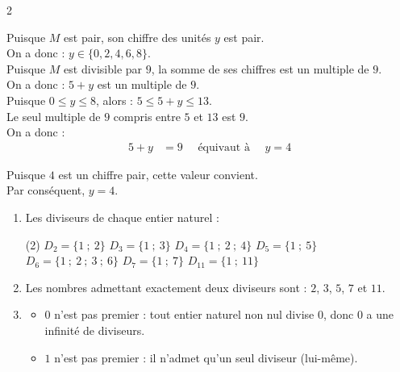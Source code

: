 \documentclass[10pt, a4paper]{article}
\begin{document}
\begin{multicols*}{2}
\begin{Solution}[APPLICATION][6]
\begin{enumerate}[leftmargin=*,itemsep=0.5pt]
    Puisque $M$ est pair, son chiffre des unités $y$ est pair. \\
    On a donc : $y \in \big\{0, 2, 4, 6, 8\big\}$. \\
    Puisque $M$ est divisible par $9$, la somme de ses chiffres est un multiple de $9$. \\
    On a donc : $5 + y$ est un multiple de $9$. \\
    Puisque $0 \leq y \leq 8$, alors : $5 \leq 5 + y \leq 13$. \\
    Le seul multiple de $9$ compris entre $5$ et $13$ est $9$. \\
    On a donc :
    \begin{align*}
        5 + y &= 9 \quad \text{ équivaut à } \quad y = 4
    \end{align*}

    Puisque $4$ est un chiffre pair, cette valeur convient. \\
    Par conséquent, $y = 4$.
\end{enumerate}
\end{Solution}

\begin{Solution}[ACTIVITÉ][2]

\begin{enumerate}[leftmargin=*,itemsep=0.5pt]
    \item Les diviseurs de chaque entier naturel :
\begin{tasks}[label=$\bullet$, label-width=12pt, item-indent=15pt](2)
    \task $D_2 = \big\{1 ~;~ 2\big\}$
    \task $D_3 = \big\{1 ~;~ 3\big\}$
    \task $D_4 = \big\{1 ~;~ 2 ~;~ 4\big\}$
    \task $D_5 = \big\{1 ~;~ 5\big\}$
    \task $D_6 = \big\{1 ~;~ 2 ~;~  3 ~;~ 6\big\}$
    \task $D_7 = \big\{1 ~;~ 7\big\}$
    \task $D_{11} = \big\{1 ~;~ 11\big\}$
\end{tasks}


    \item Les nombres admettant exactement deux diviseurs sont : $2$, $3$, $5$, $7$ et $11$.

    \item \begin{itemize}[leftmargin=*,itemsep=0.5pt]
    \item $0$ n'est pas premier : tout entier naturel non nul divise $0$, donc $0$ a une infinité de diviseurs.
    \item $1$ n'est pas premier : il n'admet qu'un seul diviseur (lui-même).
\end{itemize}


\end{enumerate}
\end{Solution}
\end{multicols*}
\end{document}
